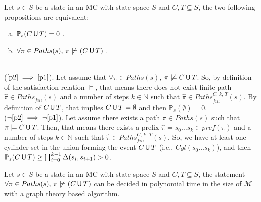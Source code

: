 \begin{lemma} Let $s \in S$ be a state in an MC with state space $S$ and $C, T \subseteq S$, the two following propositions are equivalent:
  \begin{enumerate}[(a)]
    \item $\mathbb{P}_s(C \,\text{\sffamily U}\, T) = 0$ \label{p1}.
    \item $\forall \pi \in Paths(s), \, \pi \not \models (C \,\text{\sffamily U}\, T)$ \label{p2}.
  \end{enumerate}
\end{lemma}

 \begin{proof2}$ $\\
    ($\ref{p2}\implies\ref{p1}$). Let assume that $\forall \pi \in
    Paths(s)$, $\pi \centernot\models C \U T$. So, by definition of the satisfaction relation $\models$, that
    means there does not exist finite path $\hat{\pi} \in
    Paths_{fin}(s)$ and a number of steps $k \in \mathbb{N}$ such that
    $\hat{\pi} \in Paths_{fin}^{C, \, k,\, T}(s)$. By definition
    of $C \,\text{\sffamily U}\, T$, that implies $C \,\text{\sffamily U}\, T = \emptyset$ and then
    $\mathbb{P}_s(\emptyset) = 0$.\\
    ($\neg\ref{p2}\implies\neg\ref{p1}$). Let assume there exists a path $\pi \in Paths(s)$ such that $\pi \models C \,\text{\sffamily U}\, T$.
    Then, that means there exists a prefix $\hat{\pi} = s_0 \dots s_k \in pref(\pi)$ and a number of steps $k \in \mathbb{N}$ such that
    $\hat{\pi} \in Paths_{fin}^{C, \, k, \, T}(s)$. So, we have at least one cylinder set in the union forming the event $C \,\text{\sffamily U}\, T$ (i.e., $Cyl(s_0\dots s_k)$), and then $\mathbb{P}_s(C \,\text{\sffamily U}\, T) \geq \prod_{i = 0}^{k-1} \Delta(s_i , s_{i+1}) > 0$.
 \end{proof2}

\begin{lemma}[Computing $S_{=0}$ with graph theory]\label{S0graph}
Let $s \in S$ be a state in an MC with state space $S$ and $C, T \subseteq S$,
  the statement $\forall \pi \in Paths(s), \, \pi \centernot \models (C \U T)$ can be decided in polynomial time in the size of $\mathcal{M}$ with a graph theory based algorithm.
\end{lemma}

